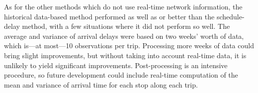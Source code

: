 As for the other methods which do not use real-time network information, the historical data-based method performed as well as or better than the schedule-delay method, with a few situations where it did not perform so well. The average and variance of arrival delays were based on two weeks' worth of data, which is---at most---10 observations per trip. Processing more weeks of data could bring slight improvements, but without taking into account real-time data, it is unlikely to yield significant improvements. Post-processing is an intensive procedure, so future development could include real-time computation of the mean and variance of arrival time for each stop along each trip.
